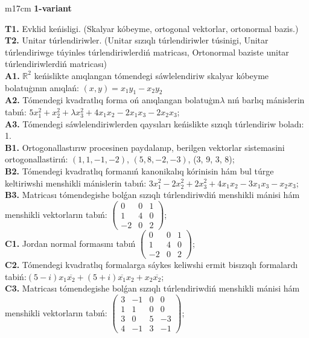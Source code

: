 \documentclass{article}
\begin{document}


\begin{tabular}{m{17cm}}
\textbf{1-variant}
\newline

\textbf{T1.} Evklid keńisligi. (Skalyar kóbeyme, ortogonal vektorlar, ortonormal bazis.) \\
\textbf{T2.} Unitar túrlendiriwler. (Unitar sızıqlı túrlendiriwler túsinigi,  Unitar túrlendiriwge túyinles túrlendiriwlerdiń matricası,   Ortonormal baziste unitar túrlendiriwlerdiń matricası) \\
\textbf{A1.} \(\mathbb{R}^{2}\) keńislikte anıqlangan tómendegi sáwlelendiriw skalyar kóbeyme bolatuģının anıqlań: \((x,y) = x_{1}y_{1} - x_{2}y_{2}\) \\
\textbf{A2.} Tómendegi kvadratlıq forma oń anıqlangan bolatuģın\(\lambda\) nıń barlıq mánislerin tabıń: \(5x_{1}^{2} + x_{2}^{2} + \lambda x_{3}^{2} + 4x_{1}x_{2} - 2x_{1}x_{3} - 2x_{2}x_{3}\); \\
\textbf{A3.} Tómendegi sáwlelendiriwlerden qaysıları keńislikte sızıqlı túrlendiriw boladı: 1. \\
\textbf{B1.} Ortogonallastırıw procesinen paydalanıp, berilgen vektorlar sistemasini ortogonallastirıń: \((1,1, - 1, - 2)\), \((5,8, - 2, - 3)\), (3, 9, 3, 8); \\
\textbf{B2.} Tómendegi kvadratlıq formanıń kanonikalıq kórinisin hám bul túrge keltiriwshi menshikli mánislerin tabıń: \(3x_{1}^{2} - 2x_{2}^{2} + 2x_{3}^{2} + 4x_{1}x_{2} - 3x_{1}x_{3} - x_{2}x_{3}\); \\
\textbf{B3.} Matricası tómendegishe bolǵan sızıqlı túrlendiriwdiń menshikli mánisi hám menshikli vektorların tabıń: \(\begin{pmatrix} 0 & 0 & 1 \\ 1 & 4 & 0 \\  - 2 & 0 & 2 \end{pmatrix}\); \\
\textbf{C1.} Jordan normal formasını tabıń \(\begin{pmatrix} 0 & 0 & 1 \\ 1 & 4 & 0 \\  - 2 & 0 & 2 \end{pmatrix}\); \\
\textbf{C2.} Tómendegi kvadratlıq formalarga sáykes keliwshi ermit bisızıqlı formalardı tabiń:\((5 - i)x_{1}\overline{x_{2}} + (5 + i)\overline{x_{1}}x_{2} + x_{2}\overline{x_{2}}\); \\
\textbf{C3.} Matricası tómendegishe bolǵan sızıqlı túrlendiriwdiń menshikli mánisi hám menshikli vektorların tabıń: \(\begin{pmatrix} 3 & - 1 & 0 & 0 \\ 1 & 1 & 0 & 0 \\ 3 & 0 & 5 & - 3 \\ 4 & - 1 & 3 & - 1 \end{pmatrix}\); \\

\end{tabular}
\vspace{1cm}
\end{document}
